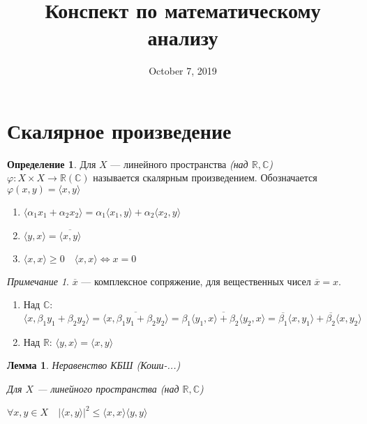 \documentclass[12pt]{article}
\title{Конспект по математическому анализу}
\date{October 7, 2019}
\theoremstyle{plain}
\newtheorem{lemma}{Лемма}
\theoremstyle{remark}
\newtheorem*{remark}{Примечание}
\theoremstyle{definition}
\newtheorem*{definition}{Определение}
\begin{document}
\maketitle

\section{Скалярное произведение}

\begin{definition}
    Для $X$ --- линейного пространства \textit{(над $\mathbb{R}, \mathbb{C}$)} $\varphi:X\times X \to \mathbb{R} (\mathbb{C})$ называется скалярным произведением. Обозначается $\varphi(x,y)=\langle x,y\rangle$
\end{definition}

\begin{enumerate}
    \item $\langle \alpha_1 x_1+\alpha_2 x_2 \rangle = \alpha_1\langle x_1,y\rangle+\alpha_2\langle x_2,y\rangle$\
    \item $\langle y,x\rangle = \overline{\langle x,y\rangle}$
    \item $\langle x,x\rangle \geq 0 \quad \langle x,x\rangle \Leftrightarrow x=0$
\end{enumerate}

\begin{remark}
    $\overline{x}$ --- комплексное сопряжение, для вещественных чисел $\overline{x} = x$.    
\end{remark}

\begin{enumerate}
    \item Над $\mathbb{C}$: $\langle x,\beta_1 y_1 + \beta_2 y_2 \rangle = \overline{\langle x,\beta_1 y_1 + \beta_2 y_2 \rangle} = \overline{\beta_1\langle y_1, x\rangle + \beta_2 \langle y_2,x \rangle} = \overline{\beta_1} \langle x, y_1\rangle + \overline{\beta_2} \langle x,y_2\rangle$
    \item Над $\mathbb{R}$: $\langle y,x\rangle = \langle x,y\rangle$
\end{enumerate}

\begin{lemma}
    Неравенство КБШ \textit{(Коши-...)}
    
    Для $X$ --- линейного пространства \textit{(над $\mathbb{R}, \mathbb{C}$)}

    $\forall x,y\in X\quad |\langle x,y\rangle|^2\leq \langle x,x\rangle \langle y,y\rangle$
\end{lemma}
\end{document}
